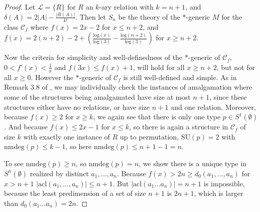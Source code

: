 \documentclass[10pt,a4paper]{amsart}
\def\nmdeg{\mathop{\rm nmdeg}}
\newcommand{\sidebar}[1]{\vskip10pt\noindent
 \hskip.70truein\vrule width2.0pt\hskip.5em
 \vbox{\hsize= 4truein\noindent\footnotesize\relax #1 }\vskip10pt\noindent}
\def\nmdeg{\operatorname{nmdeg}}
\theoremstyle{definition}
\theoremstyle{remark}
\def\Notind{\setbox0=\hbox{$x$}\kern\wd0\hbox to 0pt{\mathchardef \nn=12854\hss$\nn$\kern1.4\wd0\hss}\hbox to 0pt{\hss$\mid$\hss}\lower.9\ht0 \hbox to 0pt{\hss$\smile$\hss}\kern\wd0}
\def\nind{\mathop{\mathpalette\Notind{}}}
\numberwithin{equation}{section}
\begin{document}
\begin{proof} 
Let $\mathcal{L} = \{R\}$ for $R$ an
$k$-ary relation with $k = n+1$, and $\delta(A) = 2|A| - \frac{|R(A)|}{k!}$. Then let $S_n$ be the theory of the *-generic $M$ for the class $\mathcal{C}_f$ where $f(x) = 2x -2$ for $x \leq
n+2$, and $f(x) = 2(n+2) -2 + (\frac{\mathrm{log}(x)}{\mathrm{log}(3)}-
\frac{\mathrm{log}(n+2)}{\mathrm{log}(3)})$ for $x \geq n + 2$.


Now the criteria for simplicity and well-definedness of the $*$-generic of $\mathcal{C}_f$, $0 < f'(x) < \frac{1}{x}$ and $f(3x)
\leq f(x) + 1$, will hold for all $x \geq n+2$, but not for all $x \geq 0$.
However the $*$-generic of $\mathcal{C}_f$ is still well-defined and simple. As in Remark 3.8 of \cite{Ev02}, we may
individually check the instances of amalgamation where some of the structures
being amalgamated have size at most $n+1$, since these structures either have
no relations, or have size $n+1$ and one relation. Moreover, because $f(x) \geq 2$ for $x \geq k$, we again
see that there is only one type $p \in S^{1}(\emptyset)$. And because $f(x) \leq 2x -1$ for $x \leq k$, so there is again a structure in $\mathcal{C}_{f}$ of size $k$ with exactly one instance of $R$ up to permutation, $\mathrm{SU}(p) = 2$ with
$\mathrm{nmdeg}(p) \leq k-1$, so here $\mathrm{nmdeg}(p) \leq n+1-1 = n$.

To see  $\mathrm{nmdeg}(p) \geq n$, so $\mathrm{nmdeg}(p) = n$, we show there
is   a unique type in $S^{n}(\emptyset)$ realized by distinct $a_{1}, \ldots,
a_{n}$.
Because $f(x) > 2n \geq d_{0}(a_{1}, \ldots,
a_{n})$ for $x >n + 1$
$|\mathrm{acl}(a_{1}, \ldots, a_{n})| \leq n+1$. But $|\mathrm{acl}(a_{1} \ldots a_{n})| = n+1$ is
impossible, because the least predimension of a set of size $n+1$ is $2n+1$, which is larger than $d_{0}(a_{1} \ldots a_{n}) = 2n$.









\end{proof}
\end{document}
